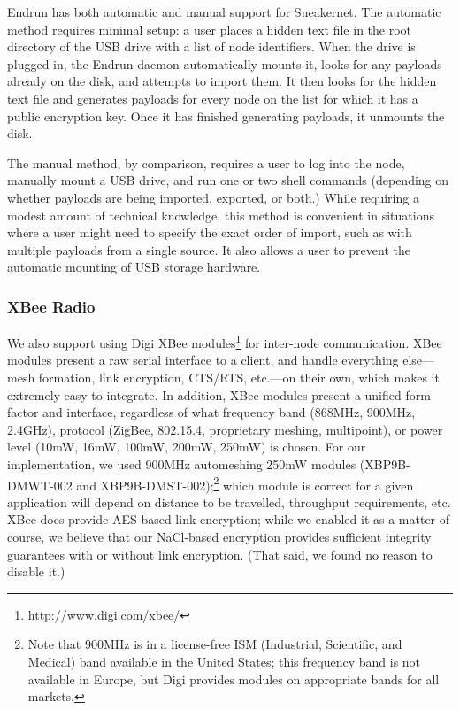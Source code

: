 \documentclass[12pt]{article}
\begin{document}
  Endrun has both automatic and manual support for Sneakernet. The automatic method requires minimal setup: a user places a hidden text file in the root directory of the USB drive with a list of node identifiers. When the drive is plugged in, the Endrun daemon automatically mounts it, looks for any payloads already on the disk, and attempts to import them. It then looks for the hidden text file and generates payloads for every node on the list for which it has a public encryption key. Once it has finished generating payloads, it unmounts the disk. 
    
  The manual method, by comparison, requires a user to log into the node, manually mount a USB drive, and run one or two shell commands (depending on whether payloads are being imported, exported, or both.) While requiring a modest amount of technical knowledge, this method is convenient in situations where a user might need to specify the exact order of import, such as with multiple payloads from a single source. It also allows a user to prevent the automatic mounting of USB storage hardware.
  
  \subsubsection{XBee Radio}
  
  We also support using Digi XBee modules\footnote{\url{http://www.digi.com/xbee/}} for inter-node communication. XBee modules present a raw serial interface to a client, and handle everything else---mesh formation, link encryption, CTS/RTS, etc.---on their own, which makes it extremely easy to integrate. In addition, XBee modules present a unified form factor and interface, regardless of what frequency band (868MHz, 900MHz, 2.4GHz), protocol (ZigBee, 802.15.4, proprietary meshing, multipoint), or power level (10mW, 16mW, 100mW, 200mW, 250mW) is chosen. For our implementation, we used 900MHz automeshing 250mW modules (XBP9B-DMWT-002 and XBP9B-DMST-002);\footnote{Note that 900MHz is in a license-free ISM (Industrial, Scientific, and Medical) band available in the United States; this frequency band is not available in Europe, but Digi provides modules on appropriate bands for all markets.} which module is correct for a given application will depend on distance to be travelled, throughput requirements, etc. XBee does provide AES-based link encryption; while we enabled it as a matter of course, we believe that our NaCl-based encryption provides sufficient integrity guarantees with or without link encryption. (That said, we found no reason to disable it.)
  
\end{document}
